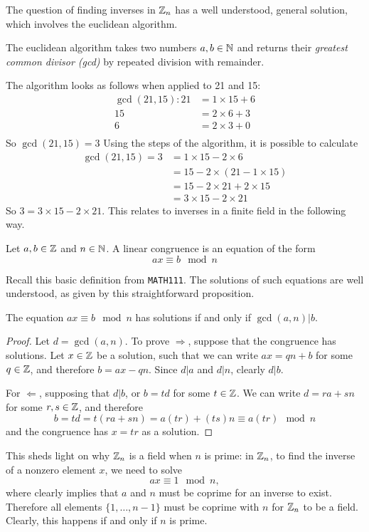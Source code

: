 The question of finding inverses in $\mathbb{Z}_{n}$ has a well understood, general solution, which involves the euclidean algorithm.
\begin{definition}
	The euclidean algorithm takes two numbers $a,b \in \mathbb{N}$ and returns their \emph{greatest common divisor (gcd)} by repeated division with remainder.
\end{definition}
The algorithm looks as follows when applied to 21 and 15:
\begin{align*}
	\gcd(21,15):21 &= 1\times15 + 6\\
	15 &= 2\times6 + 3\\
	6 &= 2\times3 + 0\\
\end{align*}
So $\gcd(21,15)=3$
Using the steps of the algorithm, it is possible to calculate
\begin{align*}
	\gcd(21,15) = 3 &= 1\times15 - 2\times6\\
	&= 15 - 2\times(21 - 1\times15)\\
	&= 15 - 2\times21 + 2\times15\\
	&=3\times15 - 2\times21
\end{align*}
So $3 = 3\times15 - 2\times21$. This relates to inverses in a finite field in the following way.
\begin{definition}
	Let $a,b \in \mathbb{Z}$ and $n \in \mathbb{N}$. A linear congruence is an equation of the form
	$$ax \equiv b \mod n$$
\end{definition}
Recall this basic definition from \texttt{MATH111}. The solutions of such equations are well understood, as given by this straightforward proposition.
\begin{proposition}
	The equation $ax \equiv b \mod n$ has solutions if and only if $\gcd(a,n)|b$.\label{congruencesolutions}
\end{proposition}
\begin{proof}
	Let $d = \gcd(a,n)$. To prove $\Rightarrow$, suppose that the congruence has solutions. Let $x \in \mathbb{Z}$ be a solution, such that we can write $ax = qn + b$ for some $q \in \mathbb{Z}$, and therefore $b = ax - qn$. Since $d|a$ and $d|n$, clearly $d|b$.

	For  $\Leftarrow$, supposing that $d|b$, or $b=td$ for some $t \in \mathbb{Z}$. We can write $d = ra + sn$ for some $r,s \in \mathbb{Z}$, and therefore
	$$b = td = t(ra + sn) = a(tr) + (ts)n \equiv a(tr) \mod n$$
	and the congruence has $x = tr$ as a solution.
\end{proof}
This sheds light on why $\mathbb{Z}_{n}$ is a field when $n$ is prime: in $\mathbb{Z}_{n}$, to find the inverse of a nonzero element $x$, we need to solve
$$ax \equiv 1 \mod n,$$
where  clearly implies that $a$ and $n$ must be coprime for an inverse to exist. Therefore all elements $\{1,\ldots,n-1\}$ must be coprime with $n$ for $\mathbb{Z}_{n}$ to be a field. Clearly, this happens if and only if $n$ is prime.

